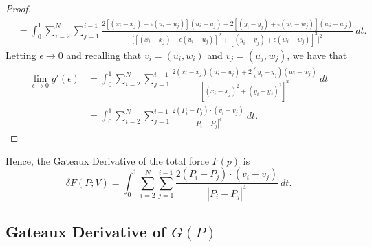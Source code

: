 \begin{proof}
\begin{align*}
                 &= \int_{ 0 }^{ 1 } \sum_{ i=2 }^{ N } \sum_{ j=1 }^{ i-1 } \frac{ 2[(x_{i} - x_{j}) + \epsilon (u_{i} - u_{j})](u_{i} - u_{j}) + 2[(y_{i} - y_{j}) + \epsilon (w_{i} - w_{j})](w_{i} - w_{j}) }{  \Big[ [(x_{i} - x_{j}) + \epsilon (u_{i} - u_{j})]^{2} + [(y_{i} - y_{j}) + \epsilon (w_{i} - w_{j})]^{2} \Big]^{2} }  \ dt.
\end{align*}
Letting \( \epsilon \to 0  \) and recalling that \( v_{i} = (u_{i}, w_{i} )  \) and \( v_{j} = (u_{j} , w_{j} ) \), we have that
\begin{align*}
    \lim_{ \epsilon  \to 0 } g'(\epsilon ) &= \int_{ 0 }^{ 1 } \sum_{ i=2 }^{ N } \sum_{ j=1 }^{ i-1 } \frac{ 2(x_{i} - x_{j})(u_{i} - u_{j}) + 2(y_{i} - y_{j})(w_{i} - w_{j}) }{ [(x_{i} - x_{j})^{2} + (y_{i} - y_{j})^{2}]^{2} }  \ dt  \\
                                           &= \int_{ 0 }^{ 1 } \sum_{ i=2 }^{ N } \sum_{ j=1 }^{ i-1 } \frac{ 2(P_{i} - P_{j}) \cdot (v_{i} - v_{j}) }{ | P_{i} - P_{j} |^{4} }  \ dt.
\end{align*}
\end{proof}
Hence, the Gateaux Derivative of the total force \( F(p) \) is 
\[  \delta F(P; V) = \int_{ 0 }^{ 1 }  \sum_{ i=2 }^{ N } \sum_{ j=1 }^{ i-1 } \frac{ 2(P_{i} - P_{j}) \cdot (v_{i} - v_{j}) }{ | P_{i} - P_{j} |^{4} }  \ dt. \]

\subsection{Gateaux Derivative of \( G(P) \)}

